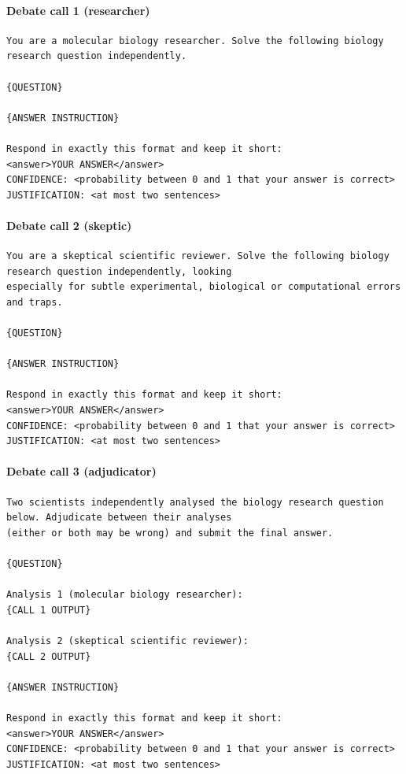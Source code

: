 \paragraph{Debate call 1 (researcher)}
\begin{footnotesize}\begin{verbatim}
You are a molecular biology researcher. Solve the following biology research question independently.

{QUESTION}

{ANSWER INSTRUCTION}

Respond in exactly this format and keep it short:
<answer>YOUR ANSWER</answer>
CONFIDENCE: <probability between 0 and 1 that your answer is correct>
JUSTIFICATION: <at most two sentences>
\end{verbatim}\end{footnotesize}

\paragraph{Debate call 2 (skeptic)}
\begin{footnotesize}\begin{verbatim}
You are a skeptical scientific reviewer. Solve the following biology research question independently, looking
especially for subtle experimental, biological or computational errors and traps.

{QUESTION}

{ANSWER INSTRUCTION}

Respond in exactly this format and keep it short:
<answer>YOUR ANSWER</answer>
CONFIDENCE: <probability between 0 and 1 that your answer is correct>
JUSTIFICATION: <at most two sentences>
\end{verbatim}\end{footnotesize}

\paragraph{Debate call 3 (adjudicator)}
\begin{footnotesize}\begin{verbatim}
Two scientists independently analysed the biology research question below. Adjudicate between their analyses
(either or both may be wrong) and submit the final answer.

{QUESTION}

Analysis 1 (molecular biology researcher):
{CALL 1 OUTPUT}

Analysis 2 (skeptical scientific reviewer):
{CALL 2 OUTPUT}

{ANSWER INSTRUCTION}

Respond in exactly this format and keep it short:
<answer>YOUR ANSWER</answer>
CONFIDENCE: <probability between 0 and 1 that your answer is correct>
JUSTIFICATION: <at most two sentences>
\end{verbatim}\end{footnotesize}
